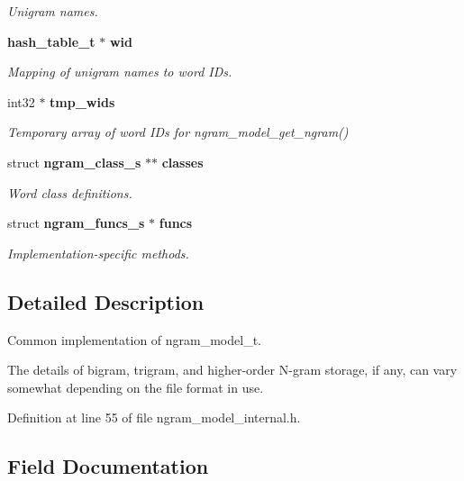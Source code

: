 \begin{DoxyCompactItemize}
\begin{DoxyCompactList}\small\item\em Unigram names. \end{DoxyCompactList}\item 
{\bf hash\-\_\-table\-\_\-t} $\ast$ {\bf wid}
\begin{DoxyCompactList}\small\item\em Mapping of unigram names to word I\-Ds. \end{DoxyCompactList}\item 
int32 $\ast$ {\bf tmp\-\_\-wids}\label{structngram__model__s_a4f910ab2c18b0e68dce92816a27fb139}

\begin{DoxyCompactList}\small\item\em Temporary array of word I\-Ds for ngram\-\_\-model\-\_\-get\-\_\-ngram() \end{DoxyCompactList}\item 
struct {\bf ngram\-\_\-class\-\_\-s} $\ast$$\ast$ {\bf classes}
\begin{DoxyCompactList}\small\item\em Word class definitions. \end{DoxyCompactList}\item 
struct {\bf ngram\-\_\-funcs\-\_\-s} $\ast$ {\bf funcs}
\begin{DoxyCompactList}\small\item\em Implementation-\/specific methods. \end{DoxyCompactList}\end{DoxyCompactItemize}


\subsection{Detailed Description}
Common implementation of ngram\-\_\-model\-\_\-t. 

The details of bigram, trigram, and higher-\/order N-\/gram storage, if any, can vary somewhat depending on the file format in use. 

Definition at line 55 of file ngram\-\_\-model\-\_\-internal.\-h.



\subsection{Field Documentation}
